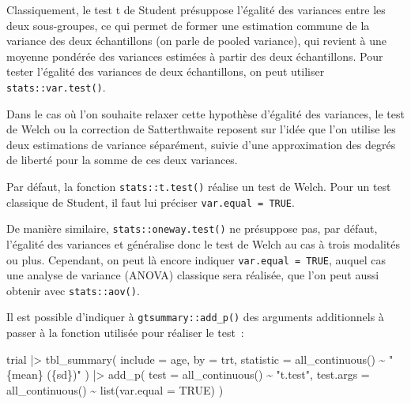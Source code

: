 \documentclass[
  letterpaper,
  DIV=11,
  numbers=noendperiod,
  oneside]{scrreprt}
\newenvironment{Shaded}{\begin{snugshade}}{\end{snugshade}}
\newcommand{\AttributeTok}[1]{\textcolor[rgb]{0.40,0.45,0.13}{#1}}
\newcommand{\ConstantTok}[1]{\textcolor[rgb]{0.56,0.35,0.01}{#1}}
\newcommand{\FunctionTok}[1]{\textcolor[rgb]{0.28,0.35,0.67}{#1}}
\newcommand{\NormalTok}[1]{\textcolor[rgb]{0.00,0.23,0.31}{#1}}
\newcommand{\SpecialCharTok}[1]{\textcolor[rgb]{0.37,0.37,0.37}{#1}}
\newcommand{\StringTok}[1]{\textcolor[rgb]{0.13,0.47,0.30}{#1}}
\begin{document}
\begin{tcolorbox}[enhanced jigsaw, colbacktitle=quarto-callout-important-color!10!white, opacityback=0, toprule=.15mm, colback=white, coltitle=black, bottomtitle=1mm, toptitle=1mm, titlerule=0mm, rightrule=.15mm, title=\textcolor{quarto-callout-important-color}{\faExclamation}\hspace{0.5em}{Précision statistique}, breakable, bottomrule=.15mm, opacitybacktitle=0.6, arc=.35mm, left=2mm, leftrule=.75mm, colframe=quarto-callout-important-color-frame]

Classiquement, le test t de Student présuppose l'égalité des variances
entre les deux sous-groupes, ce qui permet de former une estimation
commune de la variance des deux échantillons (on parle de pooled
variance), qui revient à une moyenne pondérée des variances estimées à
partir des deux échantillons. Pour tester l'égalité des variances de
deux échantillons, on peut utiliser \texttt{stats::var.test()}.

Dans le cas où l'on souhaite relaxer cette hypothèse d'égalité des
variances, le test de Welch ou la correction de Satterthwaite reposent
sur l'idée que l'on utilise les deux estimations de variance séparément,
suivie d'une approximation des degrés de liberté pour la somme de ces
deux variances.

Par défaut, la fonction \texttt{stats::t.test()} réalise un test de
Welch. Pour un test classique de Student, il faut lui préciser
\texttt{var.equal\ =\ TRUE}.

De manière similaire, \texttt{stats::oneway.test()} ne présuppose pas,
par défaut, l'égalité des variances et généralise donc le test de Welch
au cas à trois modalités ou plus. Cependant, on peut là encore indiquer
\texttt{var.equal\ =\ TRUE}, auquel cas une analyse de variance (ANOVA)
classique sera réalisée, que l'on peut aussi obtenir avec
\texttt{stats::aov()}.

Il est possible d'indiquer à \texttt{gtsummary::add\_p()} des arguments
additionnels à passer à la fonction utilisée pour réaliser le test~:

\begin{Shaded}
\begin{Highlighting}[]
\NormalTok{trial }\SpecialCharTok{|\textgreater{}} 
  \FunctionTok{tbl\_summary}\NormalTok{(}
    \AttributeTok{include =}\NormalTok{ age,}
    \AttributeTok{by =}\NormalTok{ trt,}
    \AttributeTok{statistic =} \FunctionTok{all\_continuous}\NormalTok{() }\SpecialCharTok{\textasciitilde{}} \StringTok{"\{mean\} (\{sd\})"}
\NormalTok{  ) }\SpecialCharTok{|\textgreater{}} 
  \FunctionTok{add\_p}\NormalTok{(}
    \AttributeTok{test =} \FunctionTok{all\_continuous}\NormalTok{() }\SpecialCharTok{\textasciitilde{}} \StringTok{"t.test"}\NormalTok{,}
    \AttributeTok{test.args =} \FunctionTok{all\_continuous}\NormalTok{() }\SpecialCharTok{\textasciitilde{}} \FunctionTok{list}\NormalTok{(}\AttributeTok{var.equal =} \ConstantTok{TRUE}\NormalTok{)}
\NormalTok{  )}
\end{Highlighting}
\end{Shaded}


\end{tcolorbox}
\end{document}
